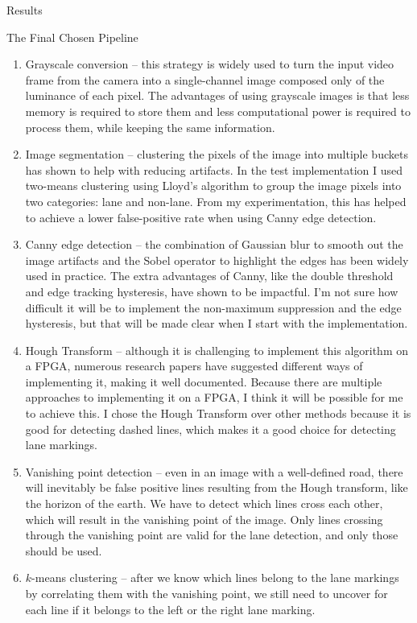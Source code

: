 \documentclass{matthijs}
\begin{document}
\begin{hoofdstuk}{Results}
\begin{paragraaf}{The Final Chosen Pipeline}
\begin{enumerate}
				\item	Grayscale conversion -- this strategy is widely used to turn the input video frame from the camera into a single-channel image composed only of the luminance of each pixel.
					The advantages of using grayscale images is that less memory is required to store them and less computational power is required to process them, while keeping the same information.
				\item	Image segmentation -- clustering the pixels of the image into multiple buckets has shown to help with reducing artifacts.
					In the test implementation I used two-means clustering using Lloyd's algorithm to group the image pixels into two categories: lane and non-lane.
					From my experimentation, this has helped to achieve a lower false-positive rate when using Canny edge detection.
				\item	Canny edge detection -- the combination of Gaussian blur to smooth out the image artifacts and the Sobel operator to highlight the edges has been widely used in practice.
					The extra advantages of Canny, like the double threshold and edge tracking hysteresis, have shown to be impactful.
					I'm not sure how difficult it will be to implement the non-maximum suppression and the edge hysteresis, but that will be made clear when I start with the implementation.
				\item	Hough Transform -- although it is challenging to implement this algorithm on a FPGA, numerous research papers have suggested different ways of implementing it, making it well documented.
					Because there are multiple approaches to implementing it on a FPGA, I think it will be possible for me to achieve this.
					I chose the Hough Transform over other methods because it is good for detecting dashed lines, which makes it a good choice for detecting lane markings.
				\item	Vanishing point detection -- even in an image with a well-defined road, there will inevitably be false positive lines resulting from the Hough transform, like the horizon of the earth.
					We have to detect which lines cross each other, which will result in the vanishing point of the image.
					Only lines crossing through the vanishing point are valid for the lane detection, and only those should be used.
				\item	$k$-means clustering -- after we know which lines belong to the lane markings by correlating them with the vanishing point, we still need to uncover for each line if it belongs to the left or the right lane marking.

\end{enumerate}
\end{paragraaf}
\end{hoofdstuk}
\end{document}
